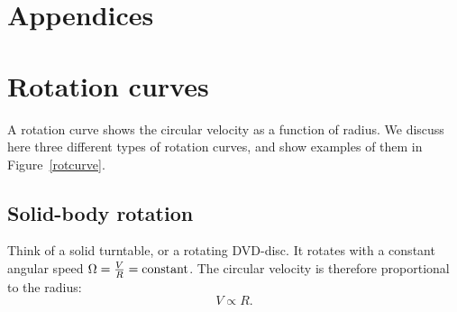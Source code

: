 \chapter*{Appendices}

\appendix

\chapter{Rotation curves}\label{app-vrot}
A rotation curve shows the circular velocity as a function of
radius. We discuss here three different types of rotation curves, and
show examples of them in Figure~\ref{rotcurve}.

\section{Solid-body rotation} 
Think of a solid turntable, or a rotating DVD-disc. It rotates with a
constant angular speed $\Omega = \frac{V}{R} = {\rm constant}$. 
The circular velocity is therefore proportional to the radius: 
\begin{equation}
V \propto R. 
\end{equation}

